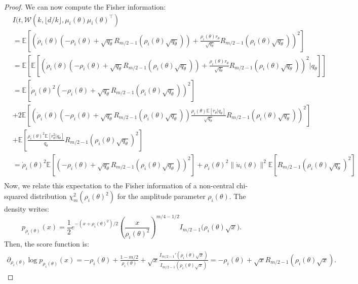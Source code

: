 \documentclass{article}
\theoremstyle{plain}
\theoremstyle{definition}
\theoremstyle{remark}
\begin{document}
\begin{proof}
We can now compute the Fisher information:
\begin{align*}
    &I(t, \mathcal{W}(k,\lfloor d/k \rfloor,\mu_i(\theta) \mu_i(\theta)^\top)\\&= \mathbb{E}\left[\left(\dot \rho_i(\theta) \left(- \rho_i(\theta) +  \sqrt{q_\theta} R_{m/2-1}\left(\rho_i(\theta)\sqrt{q_\theta}\right) \right) + \frac{\rho_i(\theta) r_\theta }{\sqrt{q_\theta}}R_{m/2-1}\left(\rho_i(\theta)\sqrt{q_\theta}\right)\right)^2 \right] \\
    &= \mathbb{E}\left[\mathbb{E}\left[\left(\dot \rho_i(\theta) \left(- \rho_i(\theta) +  \sqrt{q_\theta} R_{m/2-1}\left(\rho_i(\theta)\sqrt{q_\theta}\right) \right) + \frac{\rho_i(\theta) r_\theta }{\sqrt{q_\theta}}R_{m/2-1}\left(\rho_i(\theta)\sqrt{q_\theta}\right)\right)^2 \Bigg| q_\theta \right]\right] \\
    &= \mathbb{E}\left[\dot \rho_i(\theta)^2 \left(- \rho_i(\theta) +  \sqrt{q_\theta} R_{m/2-1}\left(\rho_i(\theta)\sqrt{q_\theta}\right) \right)^2   \right] \\
    &+2 \mathbb{E}\left[\left(\dot \rho_i(\theta) \left(- \rho_i(\theta) +  \sqrt{q_\theta} R_{m/2-1}\left(\rho_i(\theta)\sqrt{q_\theta}\right) \right) \frac{\rho_i(\theta) \mathbb{E}[r_\theta|q_\theta] }{\sqrt{q_\theta}}R_{m/2-1}\left(\rho_i(\theta)\sqrt{q_\theta}\right)\right)^2 \right] \\
    &+ \mathbb{E}\left[ \frac{\rho_i(\theta)^2\mathbb{E}[r_\theta^2|q_\theta]  }{q_\theta}R_{m/2-1}\left(\rho_i(\theta)\sqrt{q_\theta}\right)^2 \right]\\
    &= \dot \rho_i(\theta)^2 \mathbb{E}\left[ \left(- \rho_i(\theta) +  \sqrt{q_\theta} R_{m/2-1}\left(\rho_i(\theta)\sqrt{q_\theta}\right) \right)^2 \right] + \rho_i(\theta)^2\|\dot u_i(\theta)\|^2\mathbb{E}\left[R_{m/2-1}\left(\rho_i(\theta)\sqrt{q_\theta}\right)^2 \right]\\
\end{align*}
Now, we relate this expectation to the Fisher information of a non-central chi-squared distribution $\chi_m^2(\rho_i(\theta)^2)$ for the amplitude parameter $\rho_i(\theta)$. The density writes:
\[p_{\rho_i(\theta)}(x) = \frac{1}{2}e^{-(x + \rho_i(\theta)^2)/2} \left(\frac{x}{\rho_i(\theta)^2}\right)^{m/4-1/2} I_{m/2-1}\big(\rho_i(\theta)\sqrt{x}\big).\]
Then, the score function is: \begin{align*}
    \partial_{\rho_i(\theta)} \log p_{\rho_i(\theta)}(x) = - \rho_i(\theta) + \frac{1-m/2}{\rho_i(\theta)} + \sqrt{x}\frac{I_{m/2-1}'(\rho_i(\theta)\sqrt{x})}{I_{m/2-1}(\rho_i(\theta)\sqrt{x})} =  - \rho_i(\theta) + \sqrt{x} R_{m/2-1}(\rho_i(\theta) \sqrt{x}).
\end{align*}


\end{proof}
\end{document}
